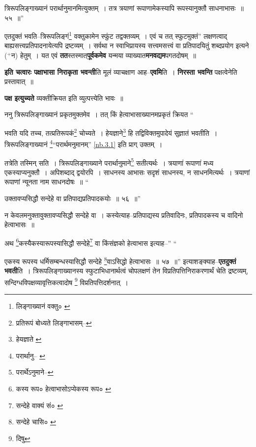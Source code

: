\documentclass[article,12pt,a4paper]{memoir}
\newcommand{\add}[1]{($^{+}$#1)}
\begin{document}
	त्रिरूपलिङ्गाख्यानं परार्थानुमानमित्युक्तम् । तत्र त्रयाणां रूपाणामेकस्यापि रूपस्यानुक्तौ साधनाभासः ॥ ५५ ॥” 
	  
	एतदुक्तं भवति--त्रिरूपलिङ्गं\footnote{लिङ्गाख्यानं वक्तु० \cite{dp-msA} \cite{dp-msB} \cite{dp-edP} \cite{dp-edH} \cite{dp-edE} \cite{dp-edN}} वक्तुकामेन स्फुंट तद्वक्तव्यम् । एवं च तत् स्फुटमुक्तं” लक्षणत्वाद् बाह्यसत्त्वप्रतिपादनायेत्यपि द्रष्टव्यम् । सर्वथा न स्वाभिप्रायस्य सत्त्वमसत्त्वं वा प्रतिपादयितुं शब्दप्रयोग इत्यने \add{न} हेतुम् । यत एवं \textbf{तत}स्तस्मात्\textbf{पूर्वकमेव} यन्मया व्याख्यात\textbf{मनवद्यम}पगतदोषम् ॥
	\pend
      

	  \pstart \textbf{इति चत्वारः पक्षाभासा निराकृता भवन्ती}ति मूलं व्याचक्षाण आह--\textbf{एवमि}ति । \textbf{निरस्ता भवन्ति} पक्षत्वेनेति प्रस्तावात् ॥
	\pend
      

	  \pstart \textbf{पक्ष इत्युच्यते} व्यक्तीक्रियत इति व्युत्पत्त्येति भावः ॥
	\pend
      

	  \pstart ननु त्रिरूपलिङ्गाख्यानं प्रकृतमुक्तमेव । तत् किं हेत्वाभासाख्यानमप्रकृतं क्रियत  \leavevmode{} “
	  
	भवति यदि तच्च, तत्प्रतिरूपकं\footnote{प्रतिरूपं बोध्यते \cite{dp-msA} \cite{dp-msB} \cite{dp-edP} \cite{dp-edH} लिङ्गाभासम्--\cite{dp-msD-n}} चोच्यते । हेयज्ञाने\footnote{हेयज्ञाते \cite{dp-edE}} हि तद्विविक्तमुपादेयं सुज्ञातं भवतीति । त्रिरूपलिङ्गाख्यानं \footnote{परार्थानु--\cite{dp-msA} \cite{dp-msB} \cite{dp-edP} \cite{dp-edH} \cite{dp-edE} \cite{dp-edN}}“परार्थमनुमानम्” \cref{nb.3.1} इति प्राग् उक्तम् । 
	  
	तत्रेति तस्मिन् सति । त्रिरूपलिङ्गाख्याने परार्थानुमाने\footnote{परार्थेऽनुमाने--\cite{dp-msC}} सतीत्यर्थः । त्रयाणां रूपाणां मध्य एकस्याप्यनुक्तौ । अपिशब्दाद् द्वयोरपि । साधनस्य आभासः सदृशं साधनस्य, न साधनमित्यर्थः । त्रयाणां रूपाणां न्यूनता नाम साधनदोषः ॥ “
	  
	उक्तावप्यसिद्धौ सन्देहे वा प्रतिपाद्यप्रतिपादकयोः ॥ ५६ ॥” 
	  
	न केवलमनुक्तावुक्तावप्यसिद्धौ सन्देहे वा । कस्येत्याह--प्रतिपाद्यस्य प्रतिवादिनः, प्रतिपादकस्य च वादिनो हेत्वाभासः ॥ 
	  
	अथ \footnote{कस्य रूप० \cite{dp-msA} \cite{dp-edP} \cite{dp-edH} \cite{dp-edE} \cite{dp-edN} हेत्वाभासोऽप्येकस्य रूप० \cite{dp-msC}}कस्यैकस्यारूपस्यासिद्धौ सन्देहे\footnote{सन्देहे वाक्यं सं० \cite{dp-msA}} वा किंसंज्ञको हेत्वाभास इत्याह--” “
	  
	एकस्य रूपस्य धर्मिसम्बन्धस्यासिद्धौ सन्देहे \footnote{सन्देहे चासि० \cite{dp-msB} \cite{dp-msC} \cite{dp-msD} \cite{dp-edP} \cite{dp-edH} \cite{dp-edE}}वाऽसिद्धो हेत्वाभासः ॥ ५७ ॥” इत्याशङ्क्याह--\textbf{एतदुक्तं भवती}ति । त्रिरूपलिङ्गाख्यानस्य स्फुटाभिधानार्थत्वं चोपलक्षणं तेन विप्रतिपत्तिनिराकरणार्थं चेति द्रष्टव्यम्, सन्दिग्धविपक्षव्यावृत्तिकत्वादोष \footnote{दिषु} विप्रतिपत्तिदर्शनात् ।
	\pend
      
\end{document}
